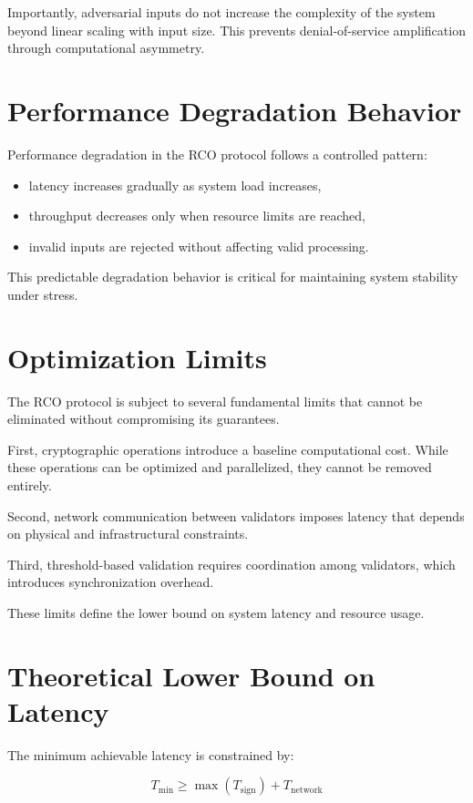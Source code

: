 Importantly, adversarial inputs do not increase the complexity of the system beyond linear scaling with input size. This prevents denial-of-service amplification through computational asymmetry.

\section{Performance Degradation Behavior}

Performance degradation in the RCO protocol follows a controlled pattern:

\begin{itemize}
\item latency increases gradually as system load increases,
\item throughput decreases only when resource limits are reached,
\item invalid inputs are rejected without affecting valid processing.
\end{itemize}

This predictable degradation behavior is critical for maintaining system stability under stress.

\section{Optimization Limits}

The RCO protocol is subject to several fundamental limits that cannot be eliminated without compromising its guarantees.

First, cryptographic operations introduce a baseline computational cost. While these operations can be optimized and parallelized, they cannot be removed entirely.

Second, network communication between validators imposes latency that depends on physical and infrastructural constraints.

Third, threshold-based validation requires coordination among validators, which introduces synchronization overhead.

These limits define the lower bound on system latency and resource usage.

\section{Theoretical Lower Bound on Latency}

The minimum achievable latency is constrained by:

\begin{equation}
T_{\text{min}} \geq \max(T_{\text{sign}}) + T_{\text{network}}
\end{equation}


